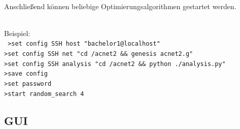 \documentclass[
  a4paper,               %
  twoside,               %
  DIV=12,                %
  BCOR=8mm,              %
  headinclude=true,      %
  footinclude=false,     %
  numbers=noenddot,      %
  headheight=40pt,       %
  11pt]{scrartcl}        %
\begin{document}
\newline\\
Anschließend können beliebige Optimierungsalgorithmen gestartet werden.\\
\newline\\
\begin{samepage}
Beispiel:\\
\texttt{
\noindent\hspace*{10mm}	>set config SSH host "bachelor1@localhost"\\
\noindent\hspace*{10mm}	>set config SSH net "cd  \raisebox{-0.6ex}{\~{ }}/acnet2 \&\& genesis acnet2.g"\\
\noindent\hspace*{10mm}	>set config SSH analysis "cd  \raisebox{-0.6ex}{\~{ }}/acnet2 \&\& python ./analysis.py"\\
\noindent\hspace*{10mm}	>save config\\
\noindent\hspace*{10mm}	>set password\\
\noindent\hspace*{10mm}	>start random\_search 4
	}\\
\end{samepage}
\subsection{GUI}
\end{document}
